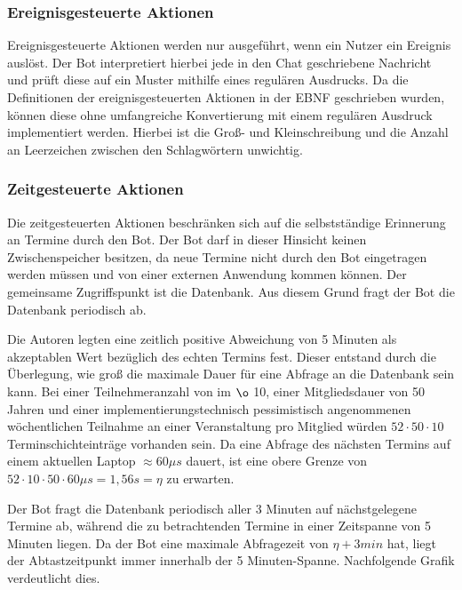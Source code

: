 \subsubsection{Ereignisgesteuerte Aktionen}

Ereignisgesteuerte Aktionen werden nur ausgeführt, wenn ein Nutzer ein Ereignis auslöst. Der Bot interpretiert hierbei jede in den Chat geschriebene Nachricht und prüft diese auf ein Muster mithilfe eines regulären Ausdrucks. Da die Definitionen der ereignisgesteuerten Aktionen in der EBNF geschrieben wurden, können diese ohne umfangreiche Konvertierung mit einem regulären Ausdruck implementiert werden. Hierbei ist die Groß- und Kleinschreibung und die Anzahl an Leerzeichen zwischen den Schlagwörtern unwichtig.

\subsubsection{Zeitgesteuerte Aktionen}

Die zeitgesteuerten Aktionen beschränken sich auf die selbstständige Erinnerung an Termine durch den Bot. Der Bot darf in dieser Hinsicht keinen Zwischenspeicher besitzen, da neue Termine nicht durch den Bot eingetragen werden müssen und von einer externen Anwendung kommen können. Der gemeinsame Zugriffspunkt ist die Datenbank. Aus diesem Grund fragt der Bot die Datenbank periodisch ab.

Die Autoren legten eine zeitlich positive Abweichung von 5 Minuten als akzeptablen Wert bezüglich des echten Termins fest. Dieser entstand durch die Überlegung, wie groß die maximale Dauer für eine Abfrage an die Datenbank sein kann. Bei einer Teilnehmeranzahl von im $\o$ 10, einer Mitgliedsdauer von 50 Jahren und einer implementierungstechnisch pessimistisch angenommenen wöchentlichen Teilnahme an einer Veranstaltung pro Mitglied würden $52 \cdot 50 \cdot 10$ Terminschichteinträge vorhanden sein. Da eine Abfrage des nächsten Termins auf einem aktuellen Laptop $\approx 60\mu s$ dauert, ist eine obere Grenze von $52 \cdot 10 \cdot 50 \cdot 60 \mu s=1,56s=\eta$ zu erwarten.

Der Bot fragt die Datenbank periodisch aller 3 Minuten auf nächstgelegene Termine ab, während die zu betrachtenden Termine in einer Zeitspanne von 5 Minuten liegen. Da der Bot eine maximale Abfragezeit von $\eta + 3min$ hat, liegt der Abtastzeitpunkt immer innerhalb der 5 Minuten-Spanne. Nachfolgende Grafik verdeutlicht dies.


